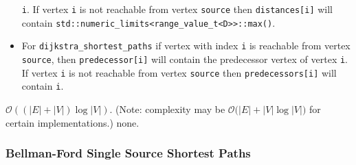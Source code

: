 \begin{itemdescr}
\begin{itemize}
                  \lstinline{i}.  If vertex \lstinline{i} is not reachable from vertex
                  \lstinline{source} then \lstinline{distances[i]} will contain
                  \lstinline{std::numeric_limits<range_value_t<D>>::max()}.
            \item
                  For \lstinline{dijkstra_shortest_paths} if vertex with index \lstinline{i} is reachable
                  from vertex \lstinline{source}, then \lstinline{predecessor[i]} will contain the
                  predecessor vertex of vertex \lstinline{i}.  If vertex \lstinline{i} is not reachable
                  from vertex \lstinline{source} then \lstinline{predecessors[i]} will contain
                  \lstinline{i}.
      \end{itemize}
      \pnum\complexity $\mathcal{O}((|E| + |V|)\log{|V|})$.  (Note: complexity may be
            $\mathcal{O}(|E| + |V|\log{|V|)}$ for certain implementations.)
      \pnum\throws none. 
\end{itemdescr}


\subsubsection{Bellman-Ford Single Source Shortest Paths}

{\small
      
}

